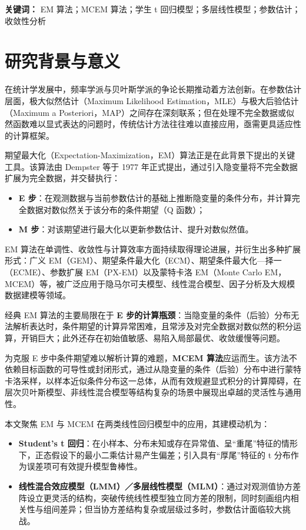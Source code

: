 \documentclass[12pt,a4paper]{ctexart}
\numberwithin{figure}{section}
\numberwithin{table}{section}
\begin{document}
\textbf{关键词：} EM 算法；MCEM 算法；学生 t 回归模型；多层线性模型；参数估计；收敛性分析

\newpage
\tableofcontents
\newpage

\section{研究背景与意义}

在统计学发展中，频率学派与贝叶斯学派的争论长期推动着方法创新。在参数估计层面，极大似然估计（Maximum Likelihood Estimation，MLE）与极大后验估计（Maximum a Posteriori，MAP）之间存在深刻联系；但在处理不完全数据或似然函数难以显式表达的问题时，传统估计方法往往难以直接应用，亟需更具适应性的计算框架。

期望最大化（Expectation-Maximization，EM）算法正是在此背景下提出的关键工具。该算法由 Dempster 等于 1977 年正式提出，通过引入隐变量将不完全数据扩展为完全数据，并交替执行：

\begin{itemize}
  \item \textbf{E 步}：在观测数据与当前参数估计的基础上推断隐变量的条件分布，并计算完全数据对数似然关于该分布的条件期望（Q 函数）；
  \item \textbf{M 步}：对该期望进行最大化以更新参数估计、提升对数似然值。
\end{itemize}

EM 算法在单调性、收敛性与计算效率方面持续取得理论进展，并衍生出多种扩展形式：广义 EM（GEM）、期望条件最大化（ECM）、期望条件最大化—择一（ECME）、参数扩展 EM（PX-EM）以及蒙特卡洛 EM（Monte Carlo EM，MCEM）等，被广泛应用于隐马尔可夫模型、线性混合模型、因子分析及大规模数据建模等领域。

经典 EM 算法的主要局限在于 \textbf{E 步的计算瓶颈}：当隐变量的条件（后验）分布无法解析表达时，条件期望的计算异常困难，且常涉及对完全数据对数似然的积分运算，开销巨大；此外还存在初始值敏感、易陷入局部最优、收敛缓慢等问题。

为克服 E 步中条件期望难以解析计算的难题，\textbf{MCEM 算法}应运而生。该方法不依赖目标函数的可导性或封闭形式，通过从隐变量的条件（后验）分布中进行蒙特卡洛采样，以样本近似条件分布这一总体，从而有效规避显式积分的计算障碍，在层次贝叶斯模型、非线性混合模型等结构复杂的场景中展现出卓越的灵活性与通用性。

本文聚焦 EM 与 MCEM 在两类线性回归模型中的应用，其建模动机为：

\begin{itemize}
  \item \textbf{Student's t 回归}：在小样本、分布未知或存在异常值、呈“重尾”特征的情形下，正态假设下的最小二乘估计易产生偏差；引入具有“厚尾”特征的 t 分布作为误差项可有效提升模型鲁棒性。
  \item \textbf{线性混合效应模型（LMM）／多层线性模型（MLM）}：通过对观测值协方差阵设立更灵活的结构，突破传统线性模型独立同方差的限制，同时刻画组内相关性与组间差异；但当协方差结构复杂或层级过多时，参数估计面临较大挑战。
\end{itemize}
\end{document}
